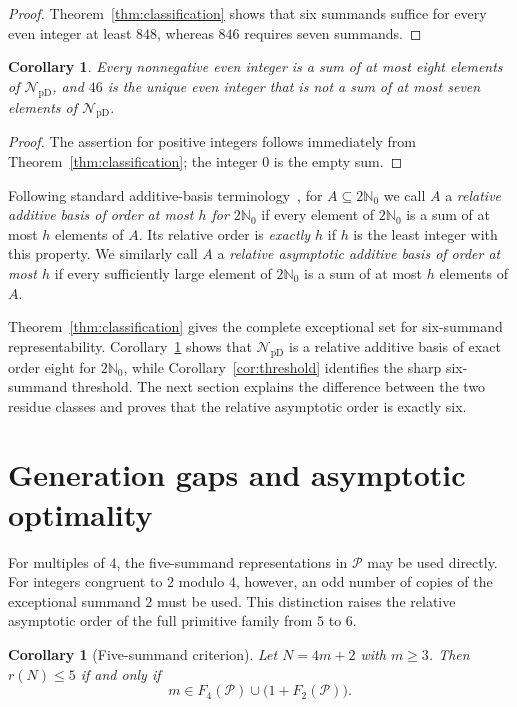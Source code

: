 \documentclass[11pt]{article}
\theoremstyle{plain}
\newtheorem{corollary}[theorem]{Corollary}
\theoremstyle{definition}
\newcommand{\NpD}{\mathcal{N}_{\mathrm{pD}}}
\newcommand{\Pset}{\mathcal P}
\begin{document}
\begin{proof}
Theorem~\ref{thm:classification} shows that six summands suffice for every
even integer at least $848$, whereas $846$ requires seven summands.
\end{proof}

\begin{corollary}\label{cor:eight}
Every nonnegative even integer is a sum of at most eight elements of
$\NpD$, and $46$ is the unique even integer that is not a sum of at most
seven elements of $\NpD$.
\end{corollary}

\begin{proof}
The assertion for positive integers follows immediately from
Theorem~\ref{thm:classification}; the integer $0$ is the empty sum.
\end{proof}

Following standard additive-basis terminology~\cite{Nathanson}, for
$A\subseteq2\mathbb N_0$ we call $A$ a \emph{relative additive basis of
order at most $h$ for $2\mathbb N_0$} if every element of $2\mathbb N_0$ is a
sum of at most $h$ elements of $A$.  Its relative order is \emph{exactly $h$}
if $h$ is the least integer with this property.  We similarly call $A$ a
\emph{relative asymptotic additive basis of order at most $h$} if every
sufficiently large element of $2\mathbb N_0$ is a sum of at most $h$ elements
of $A$.

Theorem~\ref{thm:classification} gives the complete exceptional set for
six-summand representability.  Corollary~\ref{cor:eight} shows that $\NpD$ is
a relative additive basis of exact order eight for $2\mathbb N_0$, while
Corollary~\ref{cor:threshold} identifies the sharp six-summand threshold.
The next section explains the difference between the two residue classes and
proves that the relative asymptotic order is exactly six.
\section{Generation gaps and asymptotic optimality}\label{sec:asymptotic}

For multiples of $4$, the five-summand representations in $\Pset$ may be
used directly.  For integers congruent to $2$ modulo $4$, however, an odd
number of copies of the exceptional summand $2$ must be used.  This
distinction raises the relative asymptotic order of the full primitive
family from $5$ to $6$.

\begin{corollary}[Five-summand criterion]\label{cor:fivecrit}
Let $N=4m+2$ with $m\geq3$.  Then $r(N)\leq5$ if and only if
\begin{equation}\label{eq:fivecrit}
 m\in F_4(\Pset)\cup\bigl(1+F_2(\Pset)\bigr).
\end{equation}
\end{corollary}
\end{document}
